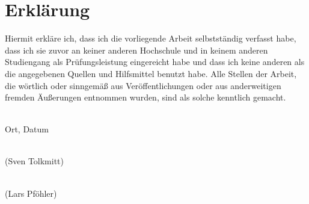 \chapter*{Erklärung}

Hiermit erkläre ich, dass ich die vorliegende Arbeit selbstständig verfasst habe, 
dass ich sie zuvor an keiner anderen Hochschule und in keinem anderen Studiengang 
als Prüfungsleistung eingereicht habe und dass ich keine anderen als die angegebenen 
Quellen und Hilfsmittel benutzt habe. Alle Stellen der Arbeit, die wörtlich oder sinngemäß
 aus Veröffentlichungen oder aus anderweitigen fremden Äußerungen entnommen wurden,
sind als solche kenntlich gemacht. 
\vspace*{5cm}

\noindent
\begin{minipage}[H]{0.4\linewidth}
  \begin{center}
    \dotfill\\
    Ort, Datum
  \end{center}
\end{minipage}
\hspace*{0.1\linewidth}
\begin{minipage}[H]{0.5\linewidth}
  \begin{center}
    \dotfill\\
    (Sven Tolkmitt)
  \end{center}
\end{minipage}

\vspace{1.5cm}

\begin{minipage}[H]{0.4\linewidth}
    \begin{center}
    \end{center}
  \end{minipage}
  \hspace*{0.1\linewidth}
  \begin{minipage}[H]{0.5\linewidth}
    \begin{center}
      \dotfill\\
      (Lars Pföhler)
    \end{center}
  \end{minipage}

  
